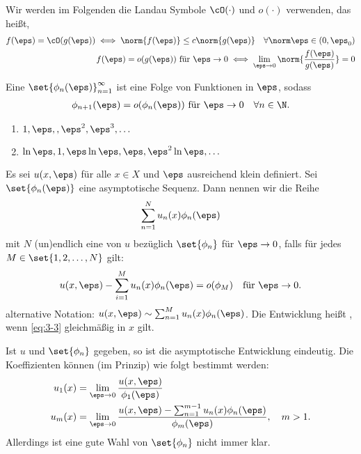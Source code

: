 Wir werden im Folgenden die Landau Symbole $\cO(\cdot)$ und $o(\cdot)$ verwenden, das heißt,
\begin{align*}
  f(\eps) = \cO(g(\eps)) \iff \norm{f(\eps)}\leq c \norm{g(\eps)} \quad \forall \norm \eps \in (0, \eps_{0})\\
  f(\eps) = o(g(\eps)) \text{ für }\eps \to 0 \iff \lim_{\eps \to 0} \norm{\frac {f(\eps)}{g(\eps)}} = 0
\end{align*}
\begin{definition}\label{def:3-2}
  Eine  $\set{\phi_{n}(\eps)}_{n = 1}^{\infty}$ ist eine Folge von Funktionen in $\eps$, sodass
  \begin{align*}
    \phi_{n+1} (\eps) = o(\phi_{n}(\eps)) \text{ für }\eps \to 0 \quad \forall n \in \N. 
  \end{align*}
\end{definition}
\begin{beispiel*}
  \begin{enumerate}
  \item $1, \eps, , \eps^{2}, \eps^{3}, \dots$
  \item $\ln \eps, 1,\eps \ln \eps, \eps, \eps^{2}\ln \eps, \dots$
  \end{enumerate}
\end{beispiel*}
\begin{definition}\label{def:3-3}
  Es sei $u(x, \eps)$ für alle $x \in X$ und $\eps$ ausreichend klein definiert. Sei $\set{\phi_{n}(\eps)}$ eine asymptotische Sequenz. Dann nennen wir die Reihe
  \begin{align*}
    \sum_{n = 1}^{N} u_{n}(x)\phi_{n}(\eps)
  \end{align*}
mit $N$ (un)endlich eine  von $u$ bezüglich $\set{\phi_{n}}$ für $\eps \to 0$, falls für jedes $M \in \set{1, 2, \dots, N}$ gilt:
\begin{align}\label{eq:3-3}
  u(x, \eps) - \sum_{i = 1}^{M} u_{n}(x)\phi_{n}(\eps) = o(\phi_{M}) \quad \text{für } \eps \to 0. 
\end{align}
alternative Notation: $u(x, \eps) \sim \sum_{n =1}^{M}u_{n}(x)\phi_{n}(\eps)$. Die Entwicklung heißt , wenn \eqref{eq:3-3} gleichmäßig in $x$ gilt. 

Ist $u$ und $\set{\phi_{n}}$ gegeben, so ist die asymptotische Entwicklung eindeutig. Die Koeffizienten können (im Prinzip) wie folgt bestimmt werden:
\begin{align*}
  u_{1}(x) &= \lim_{\eps \to 0} \frac{u(x, \eps)}{\phi_{1}(\eps)}\\
  u_{m}(x) &= \lim_{\eps \to 0} \frac{u(x, \eps) - \sum_{n = 1}^{m-1} u_{n}(x) \phi_{n}(\eps)}{\phi_{m}(\eps)}, \quad m > 1.
\end{align*}
Allerdings ist eine gute Wahl von $\set{\phi_{n}}$ nicht immer klar. 
\end{definition}
